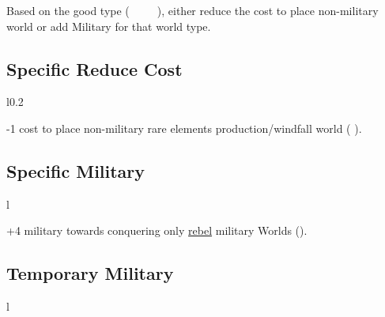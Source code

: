 \documentclass[letterpaper,landscape,twocolumn,8pt]{extarticle}
\newcommand{\inline}[1]{\scalerel*{#1}{M}}
\begin{document}
\begin{minipage}[t]{0.31\columnwidth}
Based on the good type (\inline{}~
\inline{}~
\inline{}~
\inline{}), either reduce
the cost to place non-military world or add Military for that world type.

\end{minipage}
\begin{minipage}[t]{\calc{1/3}\columnwidth}
\RaggedRight{}
\setlength{\intextsep}{0pt}%

\subsection*{Specific Reduce Cost}
\begin{wrapfigure}{l}{0.2\columnwidth}
    
\end{wrapfigure}

-1 cost to place non-military rare elements production/windfall world
\smallbreak{}
(\inline{}
\inline{}).
\subsection*{Specific Military}
\begin{wrapfigure}{l}{\columnwidth}
    
\end{wrapfigure}

+4 military towards conquering only \underline{rebel} military Worlds
(\inline{}).
\subsection*{Temporary Military}
\begin{wrapfigure}{l}{\columnwidth}
    
\end{wrapfigure}


\end{minipage}
\end{document}
